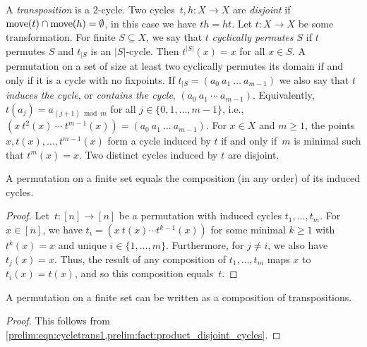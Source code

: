 A \emph{transposition} is a $2$-cycle. Two cycles~$t,h \colon X \to X$ are \emph{disjoint} if $\operatorname{move}(t) \cap \operatorname{move}(h) = \emptyset$,
in this case we have $th = ht$.  
Let $t \colon X \to X$ be some transformation.
For finite $S \subseteq X$, we say that $t$
\emph{cyclically permutes $S$} if $t$ permutes $S$
and $t_{|S}$ is an $|S|$-cycle. 
Then $t^{|S|}(x) = x$ for all $x \in S$. A permutation on a set of size at least two cyclically permutes its domain
if and only if it is a cycle with no fixpoints.
If $t_{|S} = (a_0 ~ a_1 ~ \ldots ~ a_{m-1})$
we also say that $t$ 
\emph{induces the cycle}, or \emph{contains the cycle}, $(a_0 ~ a_1 ~ \cdots ~ a_{m-1})$.
Equivalently, $t(a_j) = a_{(j+1) \bmod m}$ for all $j \in \{0,1,\ldots,m-1\}$, i.e.,
$(x ~ t^2(x) ~ \cdots ~ t^{m-1}(x)) = (a_0 ~ a_1 ~ \ldots ~ a_{m-1})$.
For $x \in X$ and $m \ge 1$, the points 
$x, t(x), \ldots, t^{m-1}(x)$ form a cycle induced by $t$ if and only if~$m$ is minimal
such that $t^m(x) = x$.
Two distinct cycles induced by $t$ are disjoint.

\begin{proposition} \label{prelim:fact:product_disjoint_cycles} 
	A permutation on a finite set equals the composition (in any order) of its induced cycles.	
\end{proposition}
\begin{proof}
	Let~$t \colon [n]\to [n]$ be a permutation
	with induced cycles $t_1, \ldots, t_m$.
	For $x \in [n]$, we have $t_i = (x ~ t(x) \cdots t^{k-1}(x))$
	for some minimal $k \ge 1$ with $t^k(x) = x$ and 
	unique $i \in \{1,\ldots,m\}$.
	Furthermore, for $j \ne i$, we also have $t_j(x) = x$.
	Thus, the result of any composition of
	$t_1, \ldots, t_m$ maps $x$ to $t_i(x) = t(x)$,
	and so this composition equals~$t$.
\end{proof}

\begin{corollary} \label{prelim:fact:transpositions_generate_Sn}
	A permutation on a finite set can be written as
	a composition of transpositions.
\end{corollary}
\begin{proof}
	This follows from \cref{prelim:eqn:cycletrans1,prelim:fact:product_disjoint_cycles}.
\end{proof}